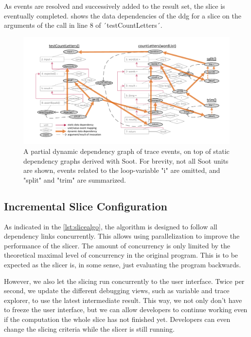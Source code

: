 As events are resolved and successively added to the result set, the slice is eventually completed.
 shows the data dependencies of the \ac{ddg} for a slice on the arguments of the call in line 8 of ´testCountLetters´.

\begin{figure}[tp]
\centering
\includegraphics[width=.95\linewidth, clip, trim=11mm 7mm 8mm 7mm]{img/graph_dynamic2}
\caption{A partial dynamic dependency graph of trace events, on top of static dependency graphs derived with Soot. For brevity, not all Soot units are shown, events related to the loop-variable "i" are omitted, and "split" and "trim" are summarized.}
\label{fig:graph_dynamic}
\end{figure}


\subsection{Incremental Slice Configuration}

\tmpStart

As indicated in the \cref{lst:slicealgo}, the algorithm is designed to follow all dependency links concurrently.
This allows using parallelization to improve the performance of the slicer.
The amount of concurrency is only limited by the theoretical maximal level of concurrency in the original program.
This is to be expected as the slicer is, in some sense, just evaluating the program backwards.

However, we also let the slicing run concurrently to the user interface.
Twice per second, we update the different debugging views, such as variable and trace explorer, to use the latest intermediate result.
This way, we not only don't have to freeze the user interface, but we can allow developers to continue working even if the computation the whole slice has not finished yet.
Developers can even change the slicing criteria while the slicer is still running.

